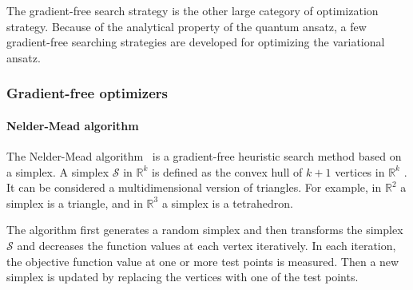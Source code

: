 The gradient-free search strategy is the other large category of optimization strategy. Because of the analytical property of the quantum ansatz, a few gradient-free searching strategies are developed for optimizing the variational ansatz. 

\subsubsection{Gradient-free optimizers}

\paragraph{Nelder-Mead algorithm}

The Nelder-Mead algorithm~\cite{nelder_simplex_1965} is a gradient-free heuristic search method based on a simplex. A simplex $\mathcal{S}$ in $\mathbb{R}^k$ is defined as the convex hull of $k+1$ vertices in $\mathbb{R}^k$ . It can be considered a multidimensional version of triangles. For example, in $\mathbb{R}^2$ a simplex is a triangle, and in $\mathbb{R}^3$ a simplex is a tetrahedron. 

The algorithm first generates a random simplex and then transforms the simplex $\mathcal{S}$ and decreases the function values at each vertex iteratively. In each iteration, the objective function value at one or more test points is measured. Then a new simplex is updated by replacing the vertices with one of the test points.

\vspace{0.5cm}


